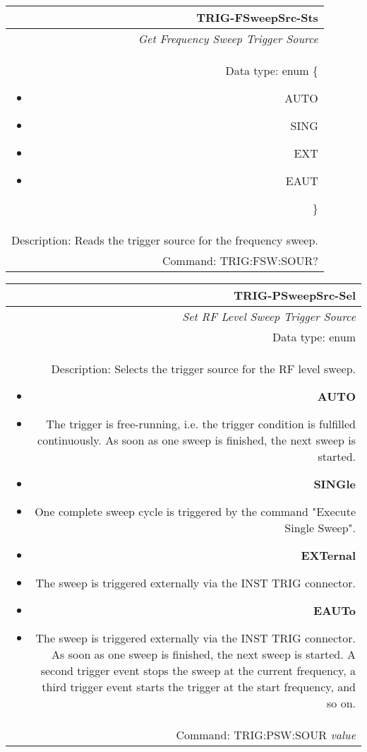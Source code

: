 \documentclass[openany]{article}
\begin{document}
		\begin{tabular}{N}
			\hline
			\bfseries TRIG-FSweepSrc-Sts \\ \hline
			\emph{Get Frequency Sweep Trigger Source} \\
			Data type: enum \{\begin{itemize}[noitemsep]
				\small
				\item[] AUTO
				\item[] SING
				\item[] EXT
				\item[] EAUT
			\end{itemize}\} \\ 
			Description: Reads the trigger source for the frequency sweep. \\
			Command: TRIG:FSW:SOUR? \\

		\end{tabular}
%
		\begin{tabular}{N}
			\hline
			\bfseries TRIG-PSweepSrc-Sel \\ \hline
			\emph{Set RF Level Sweep Trigger Source} \\
			Data type: enum \\   
			Description: Selects the trigger source for the RF level sweep.\begin{itemize}[noitemsep]
				\small
				\item[] \textbf{AUTO}
				\item[] The trigger is free-running, i.e. the trigger condition is fulfilled continuously. As soon as one sweep is finished, the next sweep is started.
                                \item[] \textbf{SINGle}
				\item[] One complete sweep cycle is triggered by the command "Execute Single Sweep".
				\item[] \textbf{EXTernal}
				\item[] The sweep is triggered externally via the INST TRIG connector.
                                \item[] \textbf{EAUTo}
				\item[] The sweep is triggered externally via the INST TRIG connector. As soon as one sweep is finished, the next sweep is started. A second trigger event stops the sweep at the current frequency, a third trigger event starts the trigger at the start frequency, and so on.

			\end{itemize} \\
			Command: TRIG:PSW:SOUR \emph{value} \\

		\end{tabular}
\end{document}
